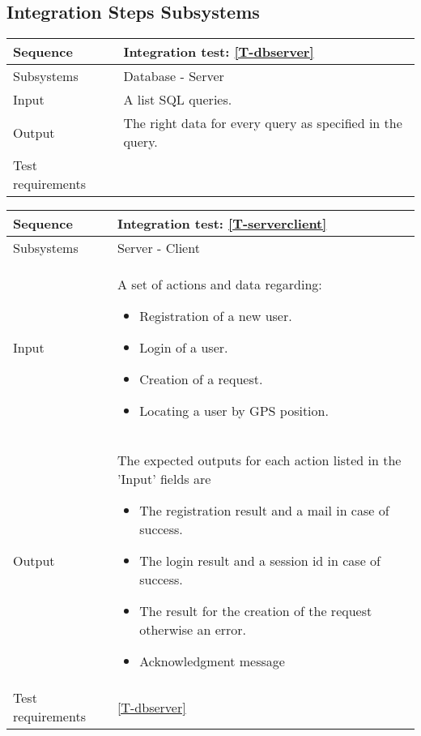 \subsection{Integration Steps Subsystems}

\begin{table}[H]
    \begin{tabularx}{\textwidth}{l|X}
        \hline
        Sequence
        & 
        Integration test: \ref{T-dbserver}
        \\ \hline
        Subsystems 
        & 
        Database - Server
        \\ \hline
        Input 
        & 
        A list SQL queries.
        \\ \hline
        Output 
        & 
        The right data for every query as specified in the query.
        \\ \hline
        Test requirements 
        & 
        
        \\ \hline
    \end{tabularx}
\end{table}

\begin{table}[H]
    \begin{tabularx}{\textwidth}{l|X}
        \hline
        Sequence
        & 
        Integration test: \ref{T-serverclient}
        \\ \hline
        Subsystems 
        & 
        Server - Client
        \\ \hline
        Input 
        & 
        A set of actions and data regarding:
        \begin{itemize}
            \item Registration of a new user.
            \item Login of a user.
            \item Creation of a request.
            \item Locating a user by GPS position.
        \end{itemize}
        \\ \hline
        Output 
        & 
        The expected outputs for each action listed in the 'Input' fields are
        \begin{itemize}
            \item The registration result and a mail in case of success.
            \item The login result and a session id in case of success.
            \item The result for the creation of the request otherwise an error.
            \item Acknowledgment message
        \end{itemize}
        \\ \hline
        Test requirements 
        & 
        \ref{T-dbserver}
        \\ \hline
    \end{tabularx}
\end{table}